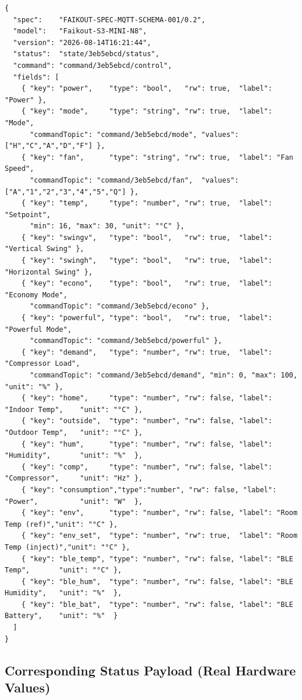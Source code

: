 \documentclass[11pt,a4paper]{article}
\begin{document}
\begin{lstlisting}[style=json]
{
  "spec":    "FAIKOUT-SPEC-MQTT-SCHEMA-001/0.2",
  "model":   "Faikout-S3-MINI-N8",
  "version": "2026-08-14T16:21:44",
  "status":  "state/3eb5ebcd/status",
  "command": "command/3eb5ebcd/control",
  "fields": [
    { "key": "power",    "type": "bool",   "rw": true,  "label": "Power" },
    { "key": "mode",     "type": "string", "rw": true,  "label": "Mode",
      "commandTopic": "command/3eb5ebcd/mode", "values": ["H","C","A","D","F"] },
    { "key": "fan",      "type": "string", "rw": true,  "label": "Fan Speed",
      "commandTopic": "command/3eb5ebcd/fan",  "values": ["A","1","2","3","4","5","Q"] },
    { "key": "temp",     "type": "number", "rw": true,  "label": "Setpoint",
      "min": 16, "max": 30, "unit": "°C" },
    { "key": "swingv",   "type": "bool",   "rw": true,  "label": "Vertical Swing" },
    { "key": "swingh",   "type": "bool",   "rw": true,  "label": "Horizontal Swing" },
    { "key": "econo",    "type": "bool",   "rw": true,  "label": "Economy Mode",
      "commandTopic": "command/3eb5ebcd/econo" },
    { "key": "powerful", "type": "bool",   "rw": true,  "label": "Powerful Mode",
      "commandTopic": "command/3eb5ebcd/powerful" },
    { "key": "demand",   "type": "number", "rw": true,  "label": "Compressor Load",
      "commandTopic": "command/3eb5ebcd/demand", "min": 0, "max": 100, "unit": "%" },
    { "key": "home",     "type": "number", "rw": false, "label": "Indoor Temp",    "unit": "°C" },
    { "key": "outside",  "type": "number", "rw": false, "label": "Outdoor Temp",   "unit": "°C" },
    { "key": "hum",      "type": "number", "rw": false, "label": "Humidity",       "unit": "%"  },
    { "key": "comp",     "type": "number", "rw": false, "label": "Compressor",     "unit": "Hz" },
    { "key": "consumption","type":"number", "rw": false, "label": "Power",          "unit": "W"  },
    { "key": "env",      "type": "number", "rw": false, "label": "Room Temp (ref)","unit": "°C" },
    { "key": "env_set",  "type": "number", "rw": true,  "label": "Room Temp (inject)","unit": "°C" },
    { "key": "ble_temp", "type": "number", "rw": false, "label": "BLE Temp",       "unit": "°C" },
    { "key": "ble_hum",  "type": "number", "rw": false, "label": "BLE Humidity",   "unit": "%"  },
    { "key": "ble_bat",  "type": "number", "rw": false, "label": "BLE Battery",    "unit": "%"  }
  ]
}
\end{lstlisting}

\subsection{Corresponding Status Payload (Real Hardware Values)}
\end{document}
